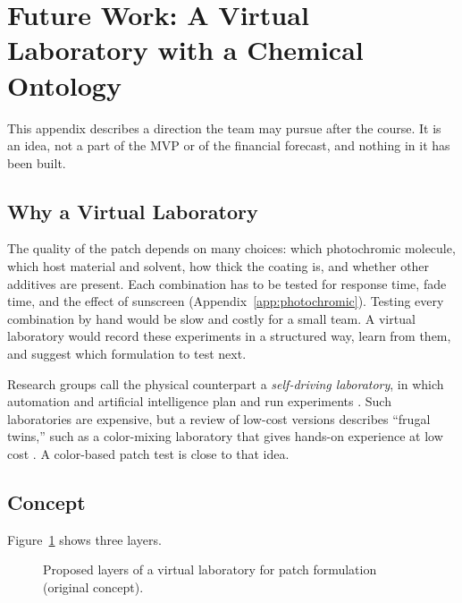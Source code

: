 \section{Future Work: A Virtual Laboratory with a Chemical Ontology}\label{app:futurework}

This appendix describes a direction the team may pursue after the course. It is an idea,
not a part of the MVP or of the financial forecast, and nothing in it has been built.

\subsection{Why a Virtual Laboratory}
The quality of the patch depends on many choices: which photochromic molecule, which host material and
solvent, how thick the coating is, and whether other additives are present. Each combination has to be
tested for response time, fade time, and the effect of sunscreen (Appendix~\ref{app:photochromic}).
Testing every combination by hand would be slow and costly for a small team. A virtual laboratory
would record these experiments in a structured way, learn from them, and suggest which formulation to
test next.

Research groups call the physical counterpart a \emph{self-driving laboratory}, in which
automation and artificial intelligence plan and run experiments \cite{abolhasani2023,tom2024}.
Such laboratories are expensive, but a review of low-cost versions describes ``frugal twins,'' such as a
color-mixing laboratory that gives hands-on experience at low cost \cite{lo2024}. A color-based patch
test is close to that idea.

\subsection{Concept}
Figure~\ref{fig:vlab} shows three layers.

\begin{figure}[ht]
  \centering
  \caption{Proposed layers of a virtual laboratory for patch formulation (original concept).}
  \label{fig:vlab}
\end{figure}

